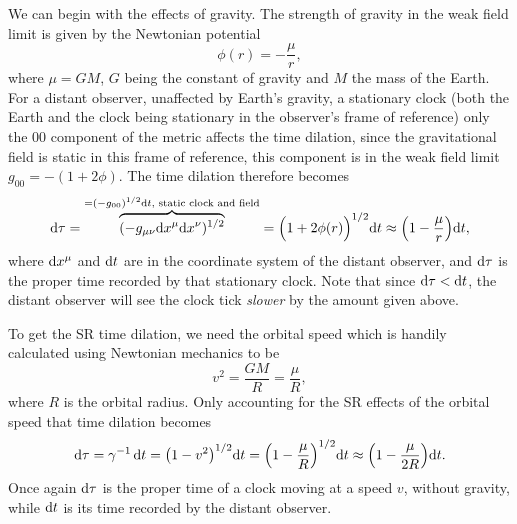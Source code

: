 \documentclass[11pt,a4paper, 
swedish, english %
]{article}
\begin{document}
We can begin with the effects of gravity. The strength of gravity in
the weak field limit is given by the Newtonian potential
\begin{equation}\label{eq3:phi}
\phi(r)=-\frac{\mu}{r},
\end{equation}
where $\mu=GM$, $G$ being the constant of gravity and $M$ the mass
of the Earth. For a distant observer, unaffected by Earth's gravity,
a stationary clock (both the Earth and the clock being stationary in
the observer's frame of reference) only the 00 component of the metric
affects the time dilation, since the gravitational field is static in
this frame of reference, this component is in the weak field limit
$g_{00}=-(1+2\phi)$. The time dilation therefore becomes 
\begin{equation}
\mathrm{d}\tau=
\overbrace{(-g_{\mu\nu}\mathrm{d}{x}^\mu\mathrm{d}{x}^\nu)^{1/2}}
^{=(-g_{00})^{1/2}\mathrm{d}{t},\text{ static clock and field}}
=\Big(1+2\phi(r)\Big)^{1/2}\mathrm{d}{t}
\approx\qty(1-\frac{\mu}{r})\mathrm{d}{t},
\end{equation}
where $\mathrm{d}{x}^\mu$ and $\mathrm{d}{t}$ are in the coordinate system of the distant
observer, and $\mathrm{d}\tau$ is the proper time recorded by that stationary
clock. Note that since $\mathrm{d}\tau<\mathrm{d}{t}$, the distant observer
will see the clock tick \emph{slower}\footnotemark{} by the amount
given above.  

To get the SR time dilation, we need the orbital speed which is
handily calculated using Newtonian mechanics to be
\begin{equation}
v^2=\frac{GM}{R}=\frac{\mu}{R},
\end{equation}
where $R$ is the orbital radius. Only accounting for the SR effects of
the orbital speed that time dilation becomes
\begin{equation}
\mathrm{d}\tau=\gamma^{-1}\,\mathrm{d}{t}=\qty(1-v^2)^{1/2}\mathrm{d}{t}
=\qty(1-\frac{\mu}{R})^{1/2}\mathrm{d}{t}
\approx\qty(1-\frac{\mu}{2R})\mathrm{d}{t}.
\end{equation}
Once again $\mathrm{d}\tau$ is the proper time of a clock moving at a speed
$v$, without gravity, while $\mathrm{d}{t}$ is its time recorded by the
distant observer. 
\end{document}
